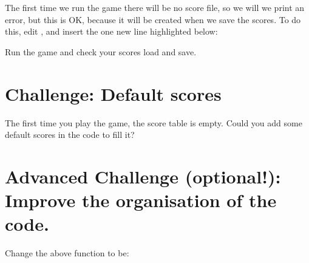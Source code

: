 \documentclass[a4paper,12pt,english]{sphinxmanual}
\begin{document}
\sphinxAtStartPar
The first time we run the game there will be no score file, so we will
we print an error, but this is OK, because it will be created when we
save the scores. To do this, edit , and insert the one
new line highlighted below:

%
\begin{sphinxVerbatim}[commandchars=\\\{\}]
 
\end{sphinxVerbatim}
\sphinxresetverbatimhllines

\sphinxAtStartPar
Run the game and check your scores load and save.


\section{Challenge: Default scores}
\label{\detokenize{tutorial:challenge-default-scores}}
\sphinxAtStartPar
The first time you play the game, the score table is empty. Could you
add some default scores in the code to fill it?


\section{Advanced Challenge (optional!): Improve the organisation of the code.}
\label{\detokenize{tutorial:advanced-challenge-optional-improve-the-organisation-of-the-code}}
\sphinxAtStartPar
Change the above function to be:

\begin{sphinxVerbatim}[commandchars=\\\{\}]
 
\end{sphinxVerbatim}
\end{document}
